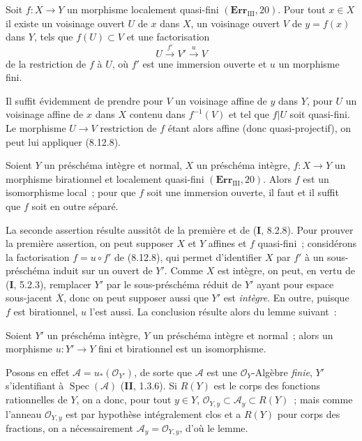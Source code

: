 \begin{corollary}[8.12.9]
\label{IV.8.12.9-fr}
Soit $f:X\to Y$ un morphisme localement quasi-fini
$(\mathbf{Err}_{\mathrm{III}}, 20)$. Pour tout $x\in X$ il existe un
voisinage ouvert $U$ de $x$ dans $X$, un voisinage ouvert $V$ de
$y=f(x)$ dans $Y$, tels que $f(U)\subset V$ et une factorisation
\[
U\xrightarrow{f'}V'\xrightarrow{u}V
\]
de la restriction de $f$ à $U$, où $f'$ est une immersion ouverte et $u$ un
morphisme fini.
\end{corollary}

Il suffit évidemment de prendre pour $V$ un voisinage affine de $y$ dans
$Y$, pour $U$ un voisinage affine de $x$ dans $X$ contenu dans $f^{-1}(V)$
et tel que $f|U$ soit quasi-fini. Le morphisme $U\to V$ restriction de $f$
étant alors affine (donc quasi-projectif), on peut lui appliquer (8.12.8).

\begin{corollary}[8.12.10]
Soient $Y$ un préschéma intègre et normal, $X$ un préschéma intègre,
$f:X\to Y$ un morphisme birationnel et localement quasi-fini
$(\mathbf{Err}_{\mathrm{III}}, 20)$. Alors $f$ est un isomorphisme local~;
pour que $f$ soit une immersion ouverte, il faut et il suffit que $f$ soit
en outre séparé.
\end{corollary}

La seconde assertion résulte aussitôt de la première et de (\textbf{I}, 8.2.8). Pour
prouver la première assertion, on peut supposer $X$ et $Y$ affines et $f$
quasi-fini~; considérons la factorisation $f=u\circ f'$ de (8.12.8), qui
permet d'identifier $X$ par $f'$ à un sous-préschéma induit sur un ouvert de
$Y'$. Comme $X$ est intègre, on peut, en vertu de (\textbf{I}, 5.2.3), remplacer
$Y'$ par le sous-préschéma réduit de $Y'$ ayant pour espace sous-jacent
$\overline X$, donc on peut supposer aussi que $Y'$ est \emph{intègre}. En
outre, puisque $f$ est birationnel, $u$ l'est aussi. La conclusion résulte
alors du lemme suivant~:

\begin{lemma}[8.12.10.1]
\label{IV.8.12.10.1-fr}
Soient $Y'$ un préschéma intègre, $Y$ un préschéma intègre et normal~; alors
un morphisme $u:Y'\to Y$ fini et birationnel est un isomorphisme.
\end{lemma}

Posons en effet $\mathcal A=u_*(\mathcal O_{Y'})$, de sorte que $\mathcal A$
est une $\mathcal O_Y$-Algèbre \emph{finie}, $Y'$ s'identifiant à
$\operatorname{Spec}(\mathcal A)$ (\textbf{II}, 1.3.6). Si $R(Y)$ est le corps des
fonctions rationnelles de $Y$, on a donc, pour tout $y\in Y$,
$\mathcal O_{Y,y}\subset\mathcal A_y\subset R(Y)$~; mais comme l'anneau
$\mathcal O_{Y,y}$ est par hypothèse intégralement clos et a $R(Y)$ pour
corps des fractions, on a nécessairement
$\mathcal A_y=\mathcal O_{Y,y}$, d'où le lemme.

